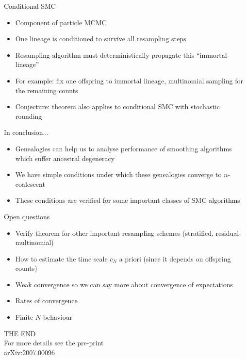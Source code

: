 \documentclass[aspectratio=169]{beamer}
\theoremstyle{definition}
\begin{document}
\begin{frame}{Conditional SMC}
\begin{itemize}
\item Component of particle MCMC
\item One lineage is conditioned to survive all resampling steps
\item Resampling algorithm must deterministically propagate this ``immortal lineage''
\item For example: fix one offspring to immortal lineage, multinomial sampling for the remaining counts
\pause
\item Conjecture: theorem also applies to conditional SMC with stochastic rounding
\end{itemize}
\end{frame}


\begin{frame}{In conclusion...}
\begin{itemize}
\item Genealogies can help us to analyse performance of smoothing algorithms which suffer ancestral degeneracy
\item We have simple conditions under which these genealogies converge to $n$-coalescent
\item These conditions are verified for some important classes of SMC algorithms
\end{itemize}

\pause

Open questions
\begin{itemize}
\item Verify theorem for other important resampling schemes (stratified, residual-multinomial)
\item How to estimate the time scale $c_N$ a priori (since it depends on offspring counts)
\item Weak convergence so we can say more about convergence of expectations
\item Rates of convergence
\item Finite-$N$ behaviour
\end{itemize}
\end{frame}

%
%


\begin{frame}
\centering
\vspace{1cm}
THE END\\
\vspace{1cm}
For more details see the pre-print\\
arXiv:2007.00096
\end{frame}
\end{document}
